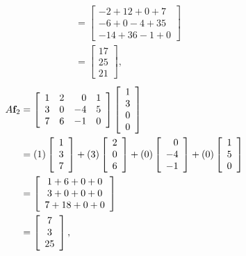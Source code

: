 \begin{example}
\begin{align*}
	&=  \left[ \begin{array}{c} -2+12+0+7 \\ -6+0-4+35 \\ -14+36-1+0\end{array} \right] \\
	&=  \left[ \begin{array}{c} 17\\25\\21 \end{array} \right],
\end{align*}
\begin{align*}
A\mathbf{f}_2 &= \left[ \begin{array}{ccrc} 1&2&0&1\\3&0&-4&5\\7&6&-1&0 \end{array} \right] \left[ \begin{array}{c} 1\\3\\0\\0 \end{array} \right] \\
	&= (1) \left[ \begin{array}{c} 1\\3\\7 \end{array} \right]  + (3)  \left[ \begin{array}{c} 2\\0\\6 \end{array} \right]  + (0)  \left[ \begin{array}{r} 0\\-4\\-1 \end{array} \right] + (0)  \left[ \begin{array}{c} 1\\5\\0 \end{array} \right] \\
	&=  \left[ \begin{array}{c} 1+6+0+0\\ 3+0+0+0 \\ 7+18+0+0\end{array} \right] \\
	&=  \left[ \begin{array}{c} 7\\3\\25 \end{array} \right],
\end{align*}

\end{example}

